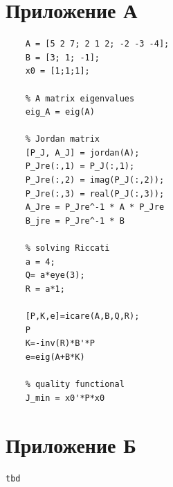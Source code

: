 \documentclass[a4paper, 12pt]{article}
\begin{document}
    \section{Приложение А}
    \begin{lstlisting}[label=task1, caption={Программа для задания 1}]
    % plant parameters
    A = [5 2 7; 2 1 2; -2 -3 -4];
    B = [3; 1; -1];
    x0 = [1;1;1];

    % A matrix eigenvalues
    eig_A = eig(A)

    % Jordan matrix
    [P_J, A_J] = jordan(A);
    P_Jre(:,1) = P_J(:,1);
    P_Jre(:,2) = imag(P_J(:,2));
    P_Jre(:,3) = real(P_J(:,3));
    A_Jre = P_Jre^-1 * A * P_Jre
    B_jre = P_Jre^-1 * B

    % solving Riccati
    a = 4;
    Q= a*eye(3);
    R = a*1;

    [P,K,e]=icare(A,B,Q,R);
    P
    K=-inv(R)*B'*P
    e=eig(A+B*K)

    % quality functional
    J_min = x0'*P*x0
    \end{lstlisting}


    \section{Приложение Б}
    \begin{lstlisting}[label=task2, caption={Программа для задания 2}]
        tbd
    \end{lstlisting}
\end{document}
